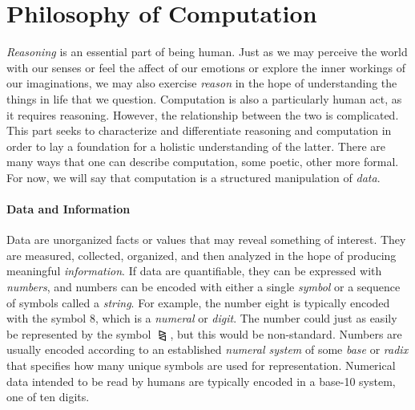 \part*{Philosophy of Computation}


\textit{Reasoning} is an essential part of being human. Just as we may perceive the world with our senses or feel the affect of our emotions or explore the inner workings of our imaginations, we may also exercise \textit{reason} in the hope of understanding the things in life that we question. Computation is also a particularly human act, as it requires reasoning. However, the relationship between the two is complicated. \\

This part seeks to characterize and differentiate reasoning and computation in order to lay a foundation for a holistic understanding of the latter. There are many ways that one can describe computation, some poetic, other more formal. For now, we will say that computation is a structured manipulation of \textit{data}. \\


\toclineskip
\subsection*{Data and Information}

Data are unorganized facts or values that may reveal something of interest. They are measured, collected, organized, and then analyzed in the hope of producing meaningful \textit{information}. If data are quantifiable, they can be expressed with \textit{numbers}, and numbers can be encoded with either a single \textit{symbol} or a sequence of symbols called a \textit{string}. For example, the number eight is typically encoded with the symbol 8, which is a \textit{numeral} or \textit{digit}. The number could just as easily be represented by the symbol $\rtriltri$, but this would be non-standard. Numbers are usually encoded according to an established \textit{numeral system} of some \textit{base} or \textit{radix} that specifies how many unique symbols are used for representation. Numerical data intended to be read by humans are typically encoded in a base-10 system, one of ten digits. \\

